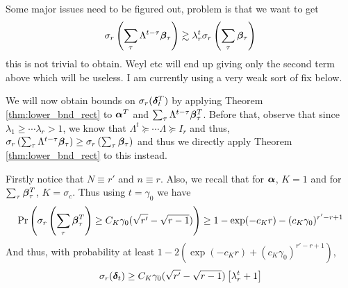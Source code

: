 \documentclass[10pt]{article}
\newcommand{\R}{\mathbb{R}}
\newtheorem{theorem}{Theorem}
\begin{document}
{%

{ \color{red} Some major issues need to be figured out, problem is that we want to get
\begin{align*}
\sigma_r\left( \sum_\tau \Lambda^{t-\tau} \bm{\beta}_\tau\right) \gtrsim \lambda_r^t \sigma_r\left( \sum_\tau \bm{\beta}_\tau\right)
\end{align*}
this is not trivial to obtain. Weyl etc will end up giving only the second term above which will be useless. I am currently using a very weak sort of fix below. 
}


We will now obtain bounds on $\sigma_r(\bm{\delta}_t^T)$ by applying Theorem \ref{thm:lower_bnd_rect} to $\bm{\alpha}^T$ and $\sum_\tau \Lambda^{t-\tau} \bm{\beta}_\tau^T$. Before that, observe that since $\lambda_1 \geq \cdots \lambda_r >1$, we know that $\Lambda^t \succeq \cdots \Lambda \succeq I_r$ and thus, $\sigma_r\left( \sum_{\tau} \Lambda^{t-\tau} \bm{\beta}_\tau \right) \geq \sigma_r\left( \sum_{\tau} \bm{\beta}_\tau \right)$ and thus we directly apply Theorem \ref{thm:lower_bnd_rect} to this instead. 


Firstly notice that $N \equiv r'$ and $n \equiv r$. Also, we recall that for $\bm{\alpha}$, $K = 1$ and for $\sum_\tau  \bm{\beta}_\tau^T$, $K = \sigma_c $. Thus using $t = \gamma_0$ we have
\begin{align*}
\Pr\left(\sigma_{r}\left(\sum_\tau \bm{\beta}_\tau^T \right) \geq C_K \gamma_0(\sqrt{r'} - \sqrt{r-1})\right) \geq  1 - \exp(-c_Kr) - (c_K \gamma_0)^{r'-r+1}
\end{align*}
And thus, with probability at least $1 - 2 (\exp(-c_Kr) + (c_K\gamma_0)^{r' - r + 1})$, 
\begin{align*}
\sigma_r(\bm{\delta}_t) \geq C_K \gamma_0(\sqrt{r'} - \sqrt{r-1}) \left[ \lambda_r^t + 1\right]
\end{align*}

}
\end{document}
